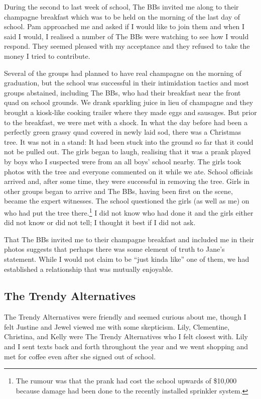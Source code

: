 During the second to last week of school, The BBs invited me along to their champagne breakfast which was to be held on the morning of the last day of school. Pam approached me and asked if I would like to join them and when I said I would, I realised a number of The BBs were watching to see how I would respond. They seemed pleased with my acceptance and they refused to take the money I tried to contribute. 

Several of the groups had planned to have real champagne on the morning of graduation, but the school was successful in their intimidation tactics and most groups abstained, including The BBs, who had their breakfast near the front quad on school grounds. We drank sparkling juice in lieu of champagne and they brought a kiosk-like cooking trailer where they made eggs and sausages. But prior to the breakfast, we were met with a shock. In what the day before had been a perfectly green grassy quad covered in newly laid sod, there was a Christmas tree. It was not in a stand: It had been stuck into the ground so far that it could not be pulled out. The girls began to laugh, realising that it was a prank played by boys who I suspected were from an all boys' school nearby. The girls took photos with the tree and everyone commented on it while we ate. School officials arrived and, after some time, they were successful in removing the tree. Girls in other groups began to arrive and The BBs, having been first on the scene, became the expert witnesses. The school questioned the girls (as well as me) on who had put the tree there.\footnote{The rumour was that the prank had cost the school upwards of \$10,000 because damage had been done to the recently installed sprinkler system.}  I did not know who had done it and the girls either did not know or did not tell; I thought it best if I did not ask.

That The BBs invited me to their champagne breakfast and included me in their photos suggests that perhaps there was some element of truth to Jane's statement. While I would not claim to be ``just kinda like'' one of them, we had established a relationship that was mutually enjoyable.

\subsection{The Trendy Alternatives}
\largerpage
The Trendy Alternatives were friendly and seemed curious about me, though I felt Justine and Jewel viewed me with some skepticism. Lily, Clementine, Christina, and Kelly were The Trendy Alternatives who I felt closest with. Lily and I sent texts back and forth throughout the year and we went shopping and met for coffee even after she signed out of school.   

